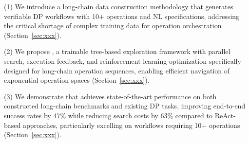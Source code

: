 (1) We introduce a long-chain data construction methodology that generates verifiable DP workflows with 10+ operations and NL specifications, addressing the critical shortage of complex training data for operation orchestration (Section~\ref{sec:xxx}).

(2) We propose \sys, a trainable tree-based exploration framework with parallel search, execution feedback, and reinforcement learning optimization specifically designed for long-chain operation sequences, enabling efficient navigation of exponential operation spaces (Section~\ref{sec:xxx}).

(3) We demonstrate that \sys achieves state-of-the-art performance on both constructed long-chain benchmarks and existing DP tasks, improving end-to-end success rates by 47\% while reducing search costs by 63\% compared to ReAct-based approaches, particularly excelling on workflows requiring 10+ operations (Section~\ref{sec:xxx}).
